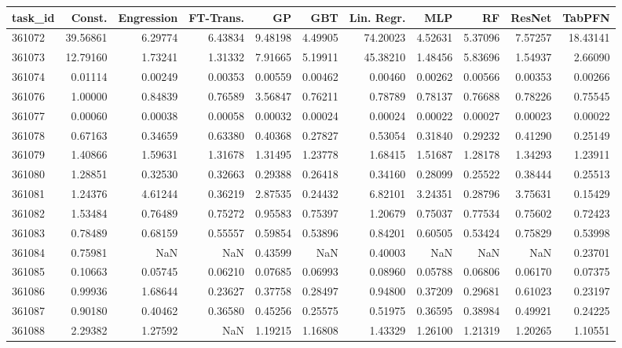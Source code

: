 \begin{tabular}{lrrrrrrrrrr}
\toprule
task\_id & Const. & Engression & FT-Trans. & GP & GBT & Lin. Regr. & MLP & RF & ResNet & TabPFN \\
\midrule
361072 & 39.56861 & 6.29774 & 6.43834 & 9.48198 & 4.49905 & 74.20023 & 4.52631 & 5.37096 & 7.57257 & 18.43141 \\
361073 & 12.79160 & 1.73241 & 1.31332 & 7.91665 & 5.19911 & 45.38210 & 1.48456 & 5.83696 & 1.54937 & 2.66090 \\
361074 & 0.01114 & 0.00249 & 0.00353 & 0.00559 & 0.00462 & 0.00460 & 0.00262 & 0.00566 & 0.00353 & 0.00266 \\
361076 & 1.00000 & 0.84839 & 0.76589 & 3.56847 & 0.76211 & 0.78789 & 0.78137 & 0.76688 & 0.78226 & 0.75545 \\
361077 & 0.00060 & 0.00038 & 0.00058 & 0.00032 & 0.00024 & 0.00024 & 0.00022 & 0.00027 & 0.00023 & 0.00022 \\
361078 & 0.67163 & 0.34659 & 0.63380 & 0.40368 & 0.27827 & 0.53054 & 0.31840 & 0.29232 & 0.41290 & 0.25149 \\
361079 & 1.40866 & 1.59631 & 1.31678 & 1.31495 & 1.23778 & 1.68415 & 1.51687 & 1.28178 & 1.34293 & 1.23911 \\
361080 & 1.28851 & 0.32530 & 0.32663 & 0.29388 & 0.26418 & 0.34160 & 0.28099 & 0.25522 & 0.38444 & 0.25513 \\
361081 & 1.24376 & 4.61244 & 0.36219 & 2.87535 & 0.24432 & 6.82101 & 3.24351 & 0.28796 & 3.75631 & 0.15429 \\
361082 & 1.53484 & 0.76489 & 0.75272 & 0.95583 & 0.75397 & 1.20679 & 0.75037 & 0.77534 & 0.75602 & 0.72423 \\
361083 & 0.78489 & 0.68159 & 0.55557 & 0.59854 & 0.53896 & 0.84201 & 0.60505 & 0.53424 & 0.75829 & 0.53998 \\
361084 & 0.75981 & NaN & NaN & 0.43599 & NaN & 0.40003 & NaN & NaN & NaN & 0.23701 \\
361085 & 0.10663 & 0.05745 & 0.06210 & 0.07685 & 0.06993 & 0.08960 & 0.05788 & 0.06806 & 0.06170 & 0.07375 \\
361086 & 0.99936 & 1.68644 & 0.23627 & 0.37758 & 0.28497 & 0.94800 & 0.37209 & 0.29681 & 0.61023 & 0.23197 \\
361087 & 0.90180 & 0.40462 & 0.36580 & 0.45256 & 0.25575 & 0.51975 & 0.36595 & 0.38984 & 0.49921 & 0.24225 \\
361088 & 2.29382 & 1.27592 & NaN & 1.19215 & 1.16808 & 1.43329 & 1.26100 & 1.21319 & 1.20265 & 1.10551 \\

\end{tabular}
